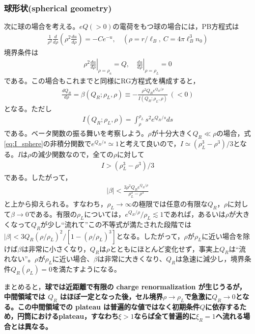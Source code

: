 \documentclass[11pt,a4paper]{ltjsarticle}
\theoremstyle{definition}
\theoremstyle{remark}
\begin{document}
\subsubsection{球形状(spherical geometry)}
次に球の場合を考える。$eQ(>0)$の電荷をもつ球の場合には，PB方程式は
\begin{align}
 \frac{1}{\rho^2}\frac{d}{d\rho}\left(\rho^2\frac{du}{d\rho}\right) = - C e^{-u},\quad (\rho=r/\ell_B,\ C=4\pi\ell_B^3n_0) \label{eq:pb_sphere}
\end{align}
境界条件は
\begin{align}
  \rho^2\left.\frac{du}{d\rho}\right|_{\rho=\rho_a} = Q, \quad \left.\frac{du}{d\rho}\right|_{\rho=\rho_L} = 0 \label{eq:boundary_sphere}
\end{align}
である。この場合もこれまでと同様にRG方程式を構成すると，
\begin{align}
  \frac{dQ_R}{d\rho} = \beta(Q_R;\rho_L,\rho) \equiv -\frac{\rho^2 Q_Re^{Q_R/\rho}}{I(Q_R;\rho_L,\rho)} \ (<0)\label{eq:beta_sphere}
\end{align}
となる。ただし
\begin{align}
  I(Q_R;\rho_L,\rho) = \int_\rho^{\rho_L}  s^2 e^{Q_R/s}  ds\label{eq:I_sphere}
\end{align}
である。ベータ関数の振る舞いを考察しよう。$\rho$が十分大きく$Q_R\ll\rho$の場合，式\eqref{eq:I_sphere}の非積分関数で$e^{Q_R/s}\simeq 1$と考えて良いので，$I\simeq (\rho_L^3-\rho^3)/3$となる。$I$は$\rho$の減少関数なので，全ての$\rho$に対して
\begin{align}
  I>(\rho_L^3-\rho^3)/3
\end{align}
である。したがって，
\begin{align}
  |\beta | < \frac{3\rho^2 Q_R e^{Q_R/\rho}}{\rho_L^3-\rho^3} \label{eq:beta_sphere_bound}
\end{align}
と上から抑えられる。すなわち，$\rho_L\to\infty$の極限では任意の有限な$Q_R$，$\rho$に対して$\beta\to 0$である。有限の$\rho_L$については，$e^{Q_R/\rho}/\rho_L \lesssim 1$であれば，あるいは$\rho$が大きくなって$Q_R$が少し``流れて''この不等式が満たされた段階では$|\beta|<3Q_R(\rho/\rho_L)^2/[1-(\rho/\rho_L)^3]$となる。したがって，$\rho$が$\rho_L$に近い場合を除けば$\beta$は非常に小さくなり，$Q_R$は$\rho$とともにほとんど変化せず，事実上$Q_R$は``流れない''。$\rho$が$\rho_L$に近い場合、$\beta$は非常に大きくなり、$Q_R$は急速に減少し，境界条件$Q_R(\rho_L)=0$を満たすようになる。

まとめると，\textbf{球では近距離で有限の charge renormalization が生じうるが，中間領域では $Q_R$ はほぼ一定となった後，セル境界$\rho\to\rho_L$で急激に$Q_R\to 0$となる。この中間領域での plateau は普遍的な値ではなく初期条件$Q$に依存するため，円筒におけるplateau，すなわち$\xi>1$ならば全て普遍的に$\xi_R=1$へ流れる場合とは異なる。}
\end{document}
